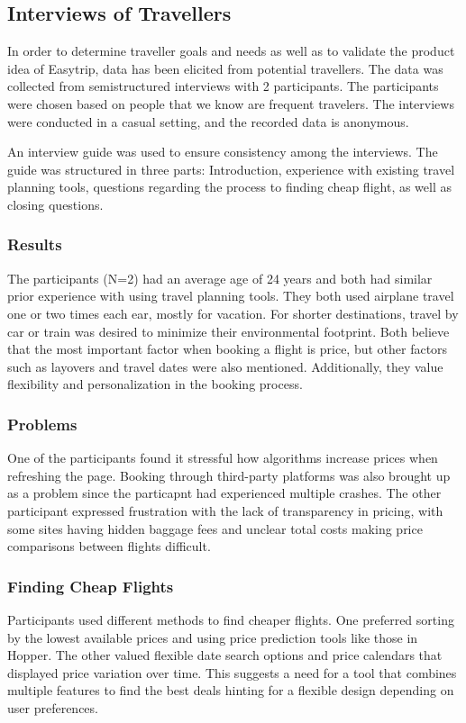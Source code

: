 \subsection{Interviews of Travellers}
In order to determine traveller goals and needs as well as to validate the product idea of Easytrip, data has been elicited from potential travellers. The data was collected from semistructured interviews with 2 participants. The participants were chosen based on people that we know are frequent travelers. The interviews were conducted in a casual setting, and the recorded data is anonymous.

An interview guide was used to ensure consistency among the interviews. The guide was structured in three parts: Introduction, experience with existing travel planning tools, questions regarding the process to finding cheap flight, as well as closing questions. 

\subsubsection{Results}
The participants (N=2) had an average age of 24 years and both had similar prior experience with using travel planning tools. They both used airplane travel one or two times each ear, mostly for vacation. For shorter destinations, travel by car or train was desired to minimize their environmental footprint. Both believe that the most important factor when booking a flight is price, but other factors such as layovers and travel dates were also mentioned. Additionally, they value flexibility and personalization in the booking process.

\subsubsection{Problems}
One of the participants found it stressful how algorithms increase prices when refreshing the page. Booking through third-party platforms was also brought up as a problem since the particapnt had experienced multiple crashes. The other participant expressed frustration with the lack of transparency in pricing, with some sites having hidden baggage fees and unclear total costs making price comparisons between flights difficult. 

\subsubsection{Finding Cheap Flights}
Participants used different methods to find cheaper flights. One preferred sorting by the lowest available prices and using price prediction tools like those in Hopper. The other valued flexible date search options and price calendars that displayed price variation over time. This suggests a need for a tool that combines multiple features to find the best deals hinting for a flexible design depending on user preferences.

